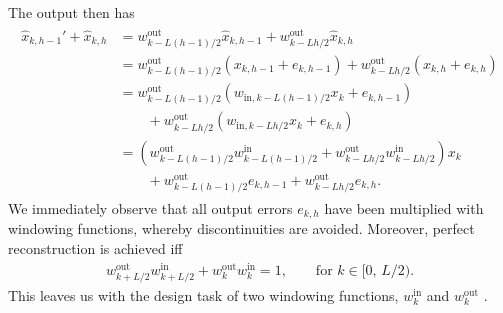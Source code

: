 \documentclass[letterpaper,10pt,english]{jupyterBook}
\begin{document}
\sphinxAtStartPar
The output then has
\begin{equation*}
\begin{split} \begin{split} \hat x_{k,h-1}'+\hat x_{k,h} &=
w^{\text{out}}_{k-L(h-1)/2} \hat x_{k,h-1} +
w^{\text{out}}_{k-Lh/2} \hat x_{k,h} \\ &=
w^{\text{out}}_{k-L(h-1)/2}(x_{k,h-1}+e_{k,h-1}) +
w^{\text{out}}_{k-Lh/2} (x_{k,h}+e_{k,h}) \\ &=
w^{\text{out}}_{k-L(h-1)/2}(w_{\text{in},k-L(h-1)/2} x_k
+e_{k,h-1}) \\&\qquad+ w^{\text{out}}_{k-Lh/2}
(w_{\text{in},k-Lh/2} x_k+e_{k,h}) \\ &=
\left(w^{\text{out}}_{k-L(h-1)/2}w^{\text{in}}_{k-L(h-1)/2} +
w^{\text{out}}_{k-Lh/2} w^{\text{in}}_{k-Lh/2}\right) x_k
\\&\qquad +
w^{\text{out}}_{k-L(h-1)/2}e_{k,h-1}+w^{\text{out}}_{k-Lh/2}e_{k,h}.
\end{split} \end{split}
\end{equation*}
\sphinxAtStartPar
We immediately observe that all output errors \(e_{k,h}\) have
been multiplied with windowing functions, whereby discontinuities are
avoided. Moreover, perfect reconstruction is achieved iff
\begin{equation*}
\begin{split} w^{\text{out}}_{k+L/2}w^{\text{in}}_{k+L/2} +
w^{\text{out}}_{k} w^{\text{in}}_{k} =
1,\qquad\text{for } k\in[0,\,L/2). \end{split}
\end{equation*}
\sphinxAtStartPar
This leaves us with the design task of two windowing functions, \(
w^{\textrm{in}}_k \) and \( w^{\textrm{out}}_k \) .
\end{document}
